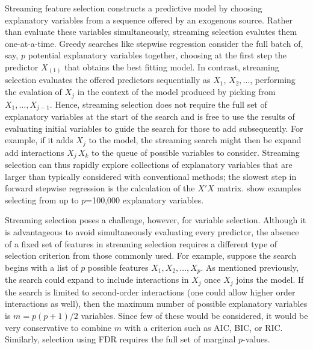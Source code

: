 \documentclass[12pt]{article}
\begin{document}
 Streaming feature selection constructs a predictive model by choosing
 explanatory variables from a sequence offered by an exogenous source.  Rather
 than evaluate these variables simultaneously, streaming selection evalutes them
 one-at-a-time.  Greedy searches like stepwise regression consider the full
 batch of, say, $p$ potential explanatory variables together, choosing at the
 first step the predictor $X_{(1)}$ that obtains the best fitting model.  In
 contrast, streaming selection evaluates the offered predictors sequentially as
 $X_1, \, X_2, \ldots$, performing the evalation of $X_j$ in the context of the
 model produced by picking from $X_1, \ldots, X_{j-1}$.  Hence, streaming
 selection does not require the full set of explanatory variables at the start
 of the search and is free to use the results of evaluating initial variables to
 guide the search for those to add subsequently.  For example, if it adds $X_j$
 to the model, the streaming search might then be expand add interactions $X_j
 \, X_k$ to the queue of possible variables to consider.  Streaming selection
 can thus rapidly explore collections of explanatory variables that are larger
 than typically considered with conventional methods; the slowest step in
 forward stepwise regression is the calculation of the $X'X$ matrix.
  \citet{fosterlin10} show examples selecting from up to $p$=100,000 explanatory
 variables.


 Streaming selection poses a challenge, however, for variable selection.
  Although it is advantageous to avoid simultaneously evaluating every
 predictor, the absence of a fixed set of features in streaming selection
 requires a different type of selection criterion from those commonly used.  For
 example, suppose the search begins with a list of $p$ possible features $X_1,
 X_2, \ldots, X_p$.  As mentioned previously, the search could expand to include
 interactions in $X_j$ once $X_j$ joins the model.  If the search is limited to
 second-order interactions (one could allow higher order interactions as well),
 then the maximum number of possible explanatory variables is $m = p(p+1)/2$
 variables.  Since few of these would be considered, it would be very
 conservative to combine $m$ with a criterion such as AIC, BIC, or RIC.
  Similarly, selection using FDR requires the full set of marginal $p$-values.
\end{document}
